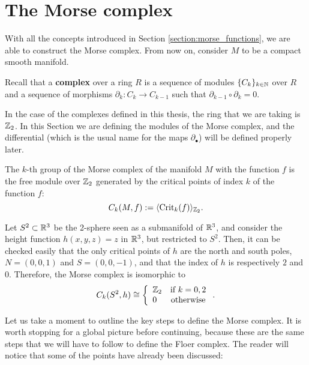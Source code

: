 \section{The Morse complex} \label{section:morse_complex}

With all the concepts introduced in Section \ref{section:morse_functions}, we are able to construct the Morse complex. From now on, consider $M$ to be a compact smooth manifold.

\begin{deff}
Recall that a {\bf complex} over a ring $R$ is a sequence of modules $\{ C_k \}_{k \in \mathbb{N}}$ over $R$ and a sequence of morphisms $\partial_k : C_k \rightarrow C_{k-1}$ such that $\partial_{k-1} \circ \partial_k = 0$.
\end{deff}

In the case of the complexes defined in this thesis, the ring that we are taking is $\mathbb{Z}_2$. In this Section we are defining the modules of the Morse complex, and the differential (which is the usual name for the maps $\partial_{\bullet}$) will be defined properly later.

\begin{deff}
The $k$-th group of the Morse complex of the manifold $M$ with the function $f$ is the free module over $\mathbb{Z}_2$ generated by the critical points of index $k$ of the function $f$:
\begin{displaymath}
C_k(M,f) := \langle \text{Crit}_k(f) \rangle_{\mathbb{Z}_2} .
\end{displaymath}
\end{deff}

\begin{exmpl}
Let $S^2 \subset \mathbb{R}^3$ be the 2-sphere seen as a submanifold of $\mathbb{R}^3$, and consider the height function $h(x,y,z) = z$ in $\mathbb{R}^3$, but restricted to $S^2$. Then, it can be checked easily that the only critical points of $h$ are the north and south poles, $N = (0,0,1)$ and $S = (0,0,-1)$, and that the index of $h$ is respectively $2$ and $0$. Therefore, the Morse complex is isomorphic to
$$C_k(S^2,h) \cong \left\{ \begin{array}{lc} \mathbb{Z}_2 & \text{if } k = 0, 2 \\ 0 & \text{otherwise} \end{array}\right. .$$
\end{exmpl}

Let us take a moment to outline the key steps to define the Morse complex. It is worth stopping for a global picture before continuing, because these are the same steps that we will have to follow to define the Floer complex. The reader will notice that some of the points have already been discussed:

